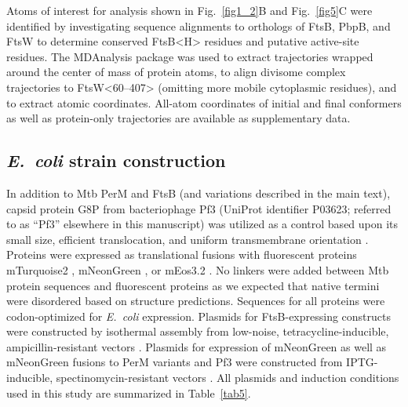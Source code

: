 \documentclass[twocolumn,pdflatex,sn-nature]{sn-jnl}%
\def\textsuperscript#1{<#1>}%
\newcommand\ec{\textit{E.~coli}}
\newcommand\mtb{Mtb}
\newcommand\ftsbH{FtsB\textsuperscript{H}}
\begin{document}
Atoms of interest for analysis shown in Fig.~\ref{fig1_2}B and Fig.~\ref{fig5}C were identified by investigating sequence alignments to orthologs of FtsB, PbpB, and FtsW to determine conserved \ftsbH{} residues and putative active-site residues.
The MDAnalysis package \cite{gowersMDAnalysisPythonPackage2016, michaud-agrawalMDAnalysisToolkitAnalysis2011} was used to extract trajectories wrapped around the center of mass of protein atoms, to align divisome complex trajectories to FtsW\textsuperscript{60--407} (omitting more mobile cytoplasmic residues), and to extract atomic coordinates.
All-atom coordinates of initial and final conformers as well as protein-only trajectories are available as supplementary data.

\subsection{\ec{} strain construction}

In addition to \mtb{} PerM and FtsB (and variations described in the main text), capsid protein G8P from bacteriophage Pf3 (UniProt identifier P03623; referred to as ``Pf3'' elsewhere in this manuscript) was utilized as a control based upon its small size, efficient translocation, and uniform transmembrane orientation \citep{kieferNegativelyChargedAmino1997}.
Proteins were expressed as translational fusions with fluorescent proteins mTurquoise2 \citep{goedhartStructureguidedEvolutionCyan2012}, mNeonGreen \citep{shanerBrightMonomericGreen2013}, or mEos3.2 \cite{zhangRationalDesignTrue2012}.
No linkers were added between \mtb{} protein sequences and fluorescent proteins as we expected that native termini were disordered based on structure predictions.
Sequences for all proteins were codon-optimized for \ec{} expression.
Plasmids for FtsB-expressing constructs were constructed by isothermal assembly from low-noise, tetracycline-inducible, ampicillin-resistant vectors \citep{henselPlasmidbasedEscherichiaColi2017}.
Plasmids for expression of mNeonGreen as well as mNeonGreen fusions to PerM variants and Pf3 were constructed from IPTG-inducible, spectinomycin-resistant vectors \citep{silvaPlasmidsIndependentlyTunable2019}.
All plasmids and induction conditions used in this study are summarized in Table~\ref{tab5}.
\end{document}
